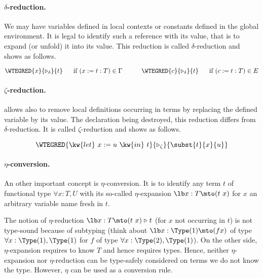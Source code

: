 \paragraph[$\delta$-reduction.]{$\delta$-reduction.\label{delta}}

We may have variables defined in local contexts or constants defined in the global
environment. It is legal to identify such a reference with its value,
that is to expand (or unfold) it into its value. This
reduction is called $\delta$-reduction and shows as follows.

$$\WTEGRED{x}{\triangleright_{\delta}}{t}~~~~~\mbox{if $(x:=t:T) \in \Gamma$}~~~~~~~~~\WTEGRED{c}{\triangleright_{\delta}}{t}~~~~~\mbox{if $(c:=t:T) \in E$}$$


\paragraph[$\zeta$-reduction.]{$\zeta$-reduction.\label{zeta}}

{\Coq} allows also to remove local definitions occurring in terms by
replacing the defined variable by its value. The declaration being
destroyed, this reduction differs from $\delta$-reduction. It is
called $\zeta$-reduction and shows as follows.

$$\WTEGRED{\kw{let}~x:=u~\kw{in}~t}{\triangleright_{\zeta}}{\subst{t}{x}{u}}$$

\paragraph{$\eta$-conversion.
\label{eta}
}
An other important concept is $\eta$-conversion. It is to identify any
term $t$ of functional type $\forall x:T, U$ with its so-called
$\eta$-expansion $\lb x:T\mto (t\ x)$ for $x$ an arbitrary variable
name fresh in $t$.

The notion of $\eta$-reduction ${\lb x:T\mto (t\ x)}{\;\triangleright\;}{t}$
(for $x$ not occurring in $t$) is not type-sound because of subtyping
(think about $\lb x:\Type(1)\mto (f x)$ of type $\forall
x:\Type(1), \Type(1)$ for $f$ of type $\forall x:\Type(2),
\Type(1)$). On the other side, $\eta$-expansion requires to know $T$
and hence requires types. Hence, neither $\eta$-expansion nor
$\eta$-reduction can be type-safely considered on terms we do not know
the type. However, $\eta$ can be used as a conversion rule.

